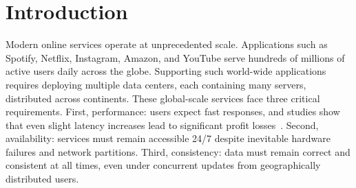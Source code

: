 
%

\chapter{Introduction}
\label{cha:introduction}





Modern online services operate at unprecedented scale. Applications such as Spotify, Netflix, Instagram, Amazon, and YouTube serve 
hundreds of millions of active users daily across the globe. Supporting such world-wide applications requires deploying multiple data centers, each containing many servers, distributed across continents.
%
These global-scale services face three critical requirements. First, performance: users expect fast responses, and studies show that even slight latency increases lead to significant profit losses~\cite{dynamo, eiger, gomez, Schurman2009latency}. Second, availability: services must remain accessible 24/7 despite inevitable hardware failures and network partitions. Third, consistency: data must remain correct and consistent at all times, even under concurrent updates from geographically distributed users.


